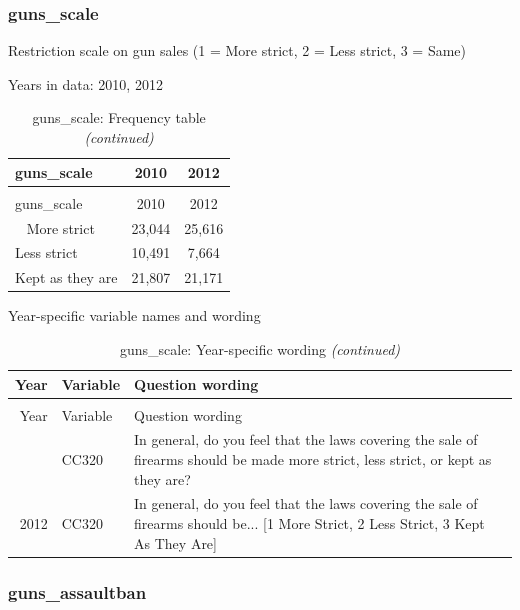 \documentclass[12pt]{article}
\begin{document}
\subsubsection{guns\_scale}\label{guns_scale}

Restriction scale on gun sales (1 = More strict, 2 = Less strict, 3 =
Same)

Years in data: 2010, 2012

\begin{longtable}[t]{lcc}
\caption{\label{tab:unnamed-chunk-4}guns\_scale: Frequency table}\\
\toprule
guns\_scale & 2010 & 2012\\
\midrule
\endfirsthead
\caption[]{guns\_scale: Frequency table \textit{(continued)}}\\
\toprule
guns\_scale & 2010 & 2012\\
\midrule
\endhead
\
\endfoot
\bottomrule
\endlastfoot
More strict & 23,044 & 25,616\\
Less strict & 10,491 & 7,664\\
Kept as they are & 21,807 & 21,171\\*
\end{longtable}

Year-specific variable names and wording

\begin{longtable}[t]{rl>{\raggedright\arraybackslash}p{10cm}}
\caption{\label{tab:unnamed-chunk-4}guns\_scale: Year-specific wording}\\
\toprule
Year & Variable & Question wording\\
\midrule
\endfirsthead
\caption[]{guns\_scale: Year-specific wording \textit{(continued)}}\\
\toprule
Year & Variable & Question wording\\
\midrule
\endhead
\
\endfoot
\bottomrule
\endlastfoot
2010 & CC320 & In general, do you feel that the laws covering the sale of firearms should be made more strict, less strict, or kept as they are?\\
2012 & CC320 & In general, do you feel that the laws covering the sale of firearms should be... [1 More Strict, 2 Less Strict, 3 Kept As They Are]\\*
\end{longtable}

\subsubsection{guns\_assaultban}\label{guns_assaultban}
\end{document}
